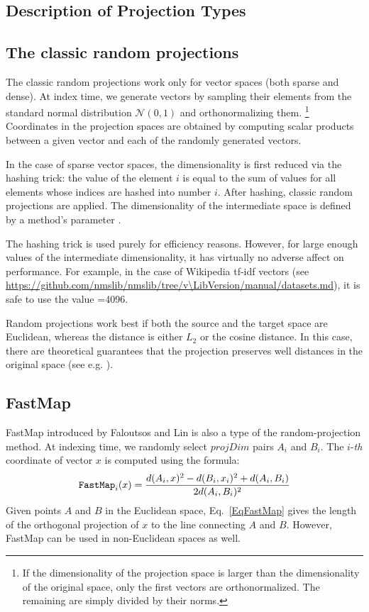 \begin{appendix}
\section{Description of Projection Types}\label{SectionProjDetails}
\subsection{The classic random projections} 
The classic random projections work only for vector spaces (both sparse and dense).
At index time, we generate  vectors by sampling their elements from
the standard normal distribution $\mathcal{N}(0,1)$ and orthonormalizing them. \footnote{If 
the dimensionality of the projection space is larger than the dimensionality of the original
space, only the first  vectors are orthonormalized. The remaining are simply
divided by their norms.}
Coordinates in the projection spaces are obtained by computing scalar products
between a given vector and each of the  randomly generated vectors.

In the case of sparse vector spaces, the dimensionality is first reduced via the hashing trick:
the value of the element $i$ is equal to the sum of values for all elements whose indices are 
hashed into number $i$. 
After hashing, classic random projections are applied. 
The dimensionality of the intermediate space is defined by a method's parameter . 

The hashing trick is used purely for efficiency reasons. 
However, for large enough values of the intermediate
dimensionality, it has virtually no adverse affect on performance.
For example, in the case of Wikipedia tf-idf vectors (see  
\url{https://github.com/nmslib/nmslib/tree/v\LibVersion/manual/datasets.md}),
it is safe to use the value =4096.

Random projections work best if both the source and the target space are Euclidean,
whereas the distance is either $L_2$ or the cosine distance.
In this case, there are theoretical guarantees that the projection preserves
well distances in the original space (see e.g. \cite{bingham2001random}).

\subsection{FastMap} 
FastMap introduced by Faloutsos and Lin \cite{faloutsos1995fastmap}
is also a type of the random-projection method. 
At indexing time, we randomly select $projDim$ pairs $A_i$ and $B_i$.
The \mbox{$i$-\textit{th}} coordinate of vector $x$ is computed using the formula:
\begin{equation}\label{EqFastMap}
\mbox{\texttt{FastMap}}_{i}(x)  = \frac{d(A_i,x)^2 - d(B_i,x_i)^2 + d(A_i,B_i)}{2 d(A_i,B_i)^2}
\end{equation}
Given points $A$ and $B$ in the Euclidean space, Eq.~\ref{EqFastMap} gives the length of the
orthogonal projection of $x$ to the line connecting $A$ and $B$.
However, FastMap can be used in non-Euclidean spaces as well.


\end{appendix}
